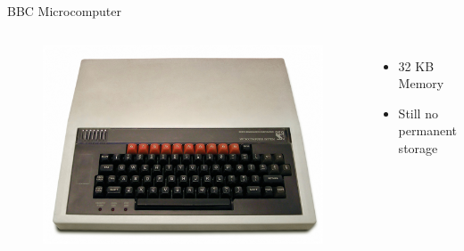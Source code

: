 \documentclass{beamer}
\begin{document}
  \begin{frame}{BBC Microcomputer}
    \begin{columns}
        \begin{figure}
          \includegraphics[scale=0.2]{images/bbc_micro}
        \end{figure}
      \begin{itemize}
          \item 32 KB Memory
          \item Still no permanent storage
        \end{itemize}
    \end{columns}
  \end{frame}
\end{document}

